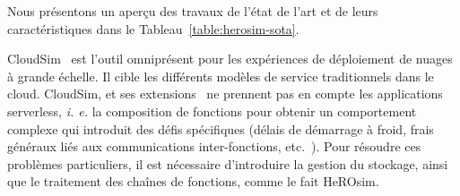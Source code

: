 Nous présentons un aperçu des travaux de l'état de l'art et de leurs caractéristiques dans le Tableau~\ref{table:herosim-sota}.

CloudSim~\cite{calheiros_cloudsim_2011} est l'outil omniprésent pour les expériences de déploiement de nuages à grande échelle. Il cible les différents modèles de service traditionnels dans le cloud.
CloudSim, et ses extensions~\cite{calheiros_cloudsim_2011, mampage_cloudsimsc_2023, wickremasinghe_cloudanalyst_2010, jeonCloudSimExtensionSimulatingDistributed2019} ne prennent pas en compte les applications serverless, \textit{i. e.} la composition de fonctions pour obtenir un comportement complexe qui introduit des défis spécifiques (délais de démarrage à froid, frais généraux liés aux communications inter-fonctions, etc.~\cite{wawrzoniakBoxerDataAnalytics2021a}). Pour résoudre ces problèmes particuliers, il est nécessaire d'introduire la gestion du stockage, ainsi que le traitement des chaînes de fonctions, comme le fait HeROsim.



